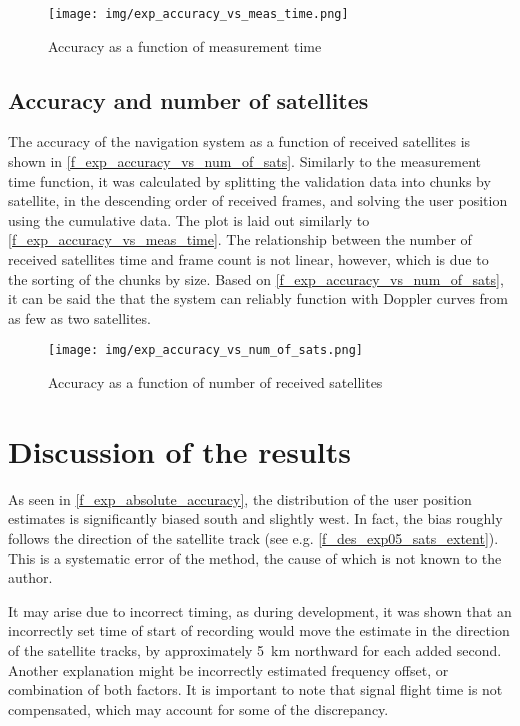 \begin{figure}
    \centering
    \texttt{[image: img/exp\_accuracy\_vs\_meas\_time.png]}
    \caption{Accuracy as a function of measurement time}
    \label{f_exp_accuracy_vs_meas_time}
\end{figure}


\subsection{Accuracy and number of satellites}
The accuracy of the navigation system as a function of received satellites is shown in \autoref{f_exp_accuracy_vs_num_of_sats}. Similarly to the measurement time function, it was calculated by splitting the validation data into chunks by satellite, in the descending order of received frames, and solving the user position using the cumulative data. The plot is laid out similarly to  \autoref{f_exp_accuracy_vs_meas_time}. The relationship between the number of received satellites time and frame count is not linear, however, which is due to the sorting of the chunks by size. Based on \autoref{f_exp_accuracy_vs_num_of_sats}, it can be said the that the system can reliably function with Doppler curves from as few as two satellites.


\begin{figure}
    \centering
    \texttt{[image: img/exp\_accuracy\_vs\_num\_of\_sats.png]}
    \caption{Accuracy as a function of number of received satellites}
    \label{f_exp_accuracy_vs_num_of_sats}
\end{figure}


\section{Discussion of the results}
As seen in \autoref{f_exp_absolute_accuracy}, the distribution of the user position estimates is significantly biased south and slightly west. In fact, the bias roughly follows the direction of the satellite track (see e.g. \autoref{f_des_exp05_sats_extent}). This is a systematic error of the method, the cause of which is not known to the author. 

It may arise due to incorrect timing, as during development, it was shown that an incorrectly set time of start of recording would move the estimate in the direction of the satellite tracks, by approximately \qty{+5}{km} northward for each added second. Another explanation might be incorrectly estimated frequency offset, or combination of both factors. It is important to note that signal flight time is not compensated, which may account for some of the discrepancy.

